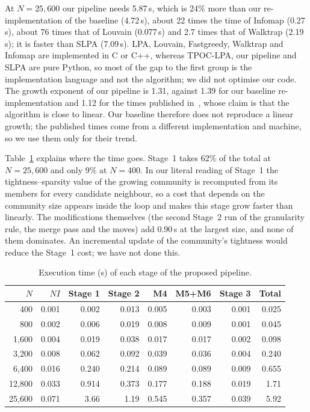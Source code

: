 \documentclass[conference]{IEEEtran}
\begin{document}
At $N=25,600$ our pipeline needs 5.87\,s, which is 24\% more than our re-implementation of the baseline (4.72\,s), about 22 times the time of Infomap (0.27\,s), about 76 times that of Louvain (0.077\,s) and 2.7 times that of Walktrap (2.19\,s); it is faster than SLPA (7.09\,s). LPA, Louvain, Fastgreedy, Walktrap and Infomap are implemented in C or C++, whereas TPOC-LPA, our pipeline and SLPA are pure Python, so most of the gap to the first group is the implementation language and not the algorithm; we did not optimise our code. The growth exponent of our pipeline is 1.31, against 1.39 for our baseline re-implementation and 1.12 for the times published in~\cite{kong2026}, whose claim is that the algorithm is close to linear. Our baseline therefore does not reproduce a linear growth; the published times come from a different implementation and machine, so we use them only for their trend.

Table~\ref{tab:stage} explains where the time goes. Stage~1 takes 62\% of the total at $N=25,600$ and only 9\% at $N=400$. In our literal reading of Stage~1 the tightness--sparsity value of the growing community is recomputed from its members for every candidate neighbour, so a cost that depends on the community size appears inside the loop and makes this stage grow faster than linearly. The modifications themselves (the second Stage~2 run of the granularity rule, the merge pass and the moves) add 0.90\,s at the largest size, and none of them dominates. An incremental update of the community's tightness would reduce the Stage~1 cost; we have not done this.

\begin{table}[t]
\centering
\caption{Execution time (s) of each stage of the proposed pipeline.}
\label{tab:stage}
\scriptsize\setlength{\tabcolsep}{3pt}
\begin{tabular}{rrrrrrrr}
\toprule
$N$ & $NI$ & Stage 1 & Stage 2 & M4 & M5+M6 & Stage 3 & Total \\
\midrule
400 & 0.001 & 0.002 & 0.013 & 0.005 & 0.003 & 0.001 & 0.025 \\
800 & 0.002 & 0.006 & 0.019 & 0.008 & 0.009 & 0.001 & 0.045 \\
1{,}600 & 0.004 & 0.019 & 0.038 & 0.017 & 0.017 & 0.002 & 0.098 \\
3{,}200 & 0.008 & 0.062 & 0.092 & 0.039 & 0.036 & 0.004 & 0.240 \\
6{,}400 & 0.016 & 0.240 & 0.214 & 0.089 & 0.089 & 0.009 & 0.655 \\
12{,}800 & 0.033 & 0.914 & 0.373 & 0.177 & 0.188 & 0.019 & 1.71 \\
25{,}600 & 0.071 & 3.66 & 1.19 & 0.545 & 0.357 & 0.039 & 5.92 \\
\bottomrule
\end{tabular}
\end{table}
\end{document}
